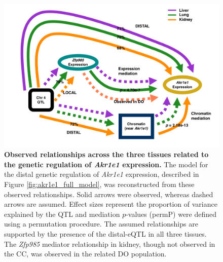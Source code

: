\documentclass[10pt,letterpaper,twoside]{article}
\begin{document}
\begin{figure}[hp]
\renewcommand{\familydefault}{\sfdefault}\normalfont
\centering
\includegraphics[width=\textwidth, trim={0in 0in 0in 0in}, clip]{figs/akr1e1_observed_relationships.png}
\caption{\textbf{Observed relationships across the three tissues related to the genetic regulation of \textit{Akr1e1} expression.} 
The model for the distal genetic regulation of \textit{Akr1e1} expression, described in Figure \ref{fig:akr1e1_full_model}, was reconstructed from these observed relationships. Solid arrows were observed, whereas dashed arrows are assumed. Effect sizes represent the proportion of variance explained by the QTL and mediation $p$-values (permP) were defined using a permutation procedure. The assumed relationships are supported by the presence of the distal-eQTL in all three tissues. The \textit{Zfp985} mediator relationship in kidney, though not observed in the CC, was observed in the related DO population.
\label{fig:akr1e1_relationships}}
\end{figure}

\clearpage
\end{document}
